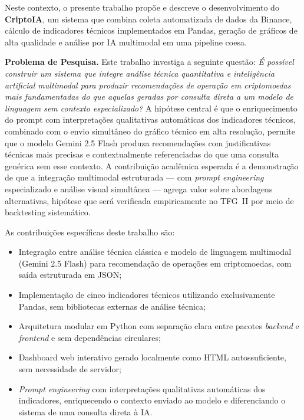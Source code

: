\documentclass[conference]{IEEEtran}
\begin{document}
Neste contexto, o presente trabalho propõe e descreve o desenvolvimento do \textbf{CriptoIA}, um sistema que combina coleta automatizada de dados da Binance, cálculo de indicadores técnicos implementados em Pandas, geração de gráficos de alta qualidade e análise por IA multimodal em uma pipeline coesa.

\textbf{Problema de Pesquisa.} Este trabalho investiga a seguinte questão: \textit{É possível construir um sistema que integre análise técnica quantitativa e inteligência artificial multimodal para produzir recomendações de operação em criptomoedas mais fundamentadas do que aquelas geradas por consulta direta a um modelo de linguagem sem contexto especializado?} A hipótese central é que o enriquecimento do prompt com interpretações qualitativas automáticas dos indicadores técnicos, combinado com o envio simultâneo do gráfico técnico em alta resolução, permite que o modelo Gemini 2.5 Flash produza recomendações com justificativas técnicas mais precisas e contextualmente referenciadas do que uma consulta genérica sem esse contexto. A contribuição acadêmica esperada é a demonstração de que a integração multimodal estruturada --- com \textit{prompt engineering} especializado e análise visual simultânea --- agrega valor sobre abordagens alternativas, hipótese que será verificada empiricamente no TFG~II por meio de backtesting sistemático.

As contribuições específicas deste trabalho são:

\begin{itemize}
  \item Integração entre análise técnica clássica e modelo de linguagem multimodal (Gemini 2.5 Flash) para recomendação de operações em criptomoedas, com saída estruturada em JSON;
  \item Implementação de cinco indicadores técnicos utilizando exclusivamente Pandas, sem bibliotecas externas de análise técnica;
  \item Arquitetura modular em Python com separação clara entre pacotes \textit{backend} e \textit{frontend} e sem dependências circulares;
  \item Dashboard web interativo gerado localmente como HTML autossuficiente, sem necessidade de servidor;
  \item \textit{Prompt engineering} com interpretações qualitativas automáticas dos indicadores, enriquecendo o contexto enviado ao modelo e diferenciando o sistema de uma consulta direta à IA.
\end{itemize}
\end{document}
